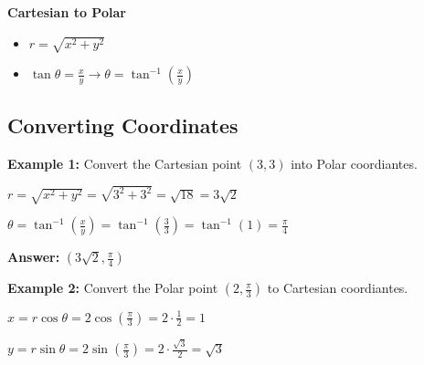 \documentclass[10pt]{article}                               %
\begin{document}
\begin{defaultbox}
\begin{adjustwidth}{2em}{0pt}
\begin{adjustwidth}{2em}{0pt}
            \vspace{0.5em}

            \textbf{Cartesian to Polar}

            \begin{itemize}
                \item \( r = \sqrt{x^2 + y^2} \)
                \item \( \tan\theta = \frac{x}{y}  \rightarrow  \theta = \tan^{-1}\left(\frac{x}{y}\right) \)
            \end{itemize}

            \vspace{0.5em}


            \begin{examplebox}

                \subsection*{Converting Coordinates}

                \textbf{Example 1:} Convert the Cartesian point \( \left(3,3\right) \) into Polar coordiantes.
                \vspace{0.5em}

                \begin{adjustwidth}{2em}{0pt}

                    \( r = \sqrt{x^2 + y^2} = \sqrt{3^2 + 3^2} = \sqrt{18} = 3\sqrt{2} \)

                    \( \theta = \tan^{-1}\left(\frac{x}{y}\right) = \tan^{-1}\left(\frac{3}{3}\right) = \tan^{-1}(1) = \frac{\pi}{4} \)

                    \textbf{Answer:} \( \left(3\sqrt{2}, \frac{\pi}{4}\right) \)

                \end{adjustwidth}

                \vspace{1em}

                \textbf{Example 2:} Convert the Polar point \( \left(2, \frac{\pi}{3}\right) \) to Cartesian coordiantes.
                \vspace{0.5em}

                \begin{adjustwidth}{2em}{0pt}

                    \( x = r\cos\theta = 2\cos\left(\frac{\pi}{3}\right) = 2 \cdot \frac{1}{2} = 1 \)

                    \( y = r\sin\theta = 2\sin\left(\frac{\pi}{3}\right) = 2 \cdot \frac{\sqrt{3}}{2} = \sqrt{3} \)


\end{adjustwidth}
\end{examplebox}
\end{adjustwidth}
\end{adjustwidth}
\end{defaultbox}
\end{document}
